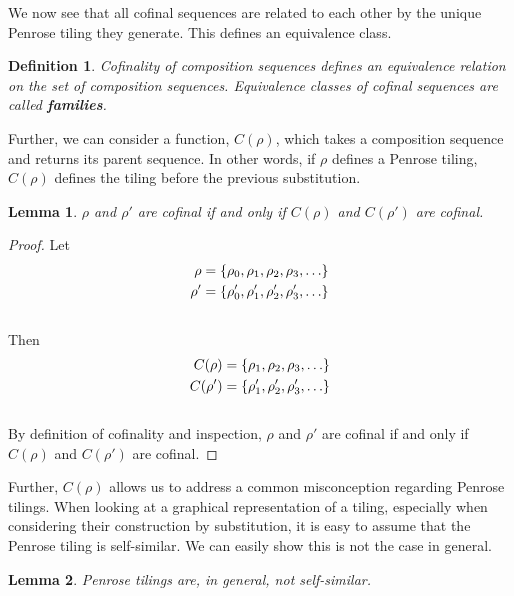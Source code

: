 \documentclass[
  oneside,
  11pt, a4paper,
  footinclude=true,
  headinclude=true,
  cleardoublepage=empty
]{scrbook}
\newtheorem{mydef}{Definition}
\newtheorem{mylem}{Lemma}
\begin{document}
We now see that all cofinal sequences are related to each other by the unique Penrose tiling they generate. This defines an equivalence class.

\begin{mydef}
Cofinality of composition sequences defines an equivalence relation on the set of composition sequences. Equivalence classes of cofinal sequences are called \textbf{families}.
\end{mydef}

Further, we can consider a function, $C(\rho)$, which takes a composition sequence and returns its parent sequence. In other words, if $\rho$ defines a Penrose tiling, $C(\rho)$ defines the tiling before the previous substitution. 

\begin{mylem}
$\rho$ and $\rho'$ are cofinal if and only if $C(\rho)$ and $C(\rho')$ are cofinal.
\end{mylem}

\begin{proof}
Let 
\begin{equation*}\begin{split}
\rho=\{\rho_0,\rho_1,\rho_2,\rho_3,\mathellipsis\}\\
\rho'=\{\rho'_0,\rho'_1,\rho'_2,\rho'_3,\mathellipsis\}
\end{split}
\end{equation*}\\
Then 
\begin{equation*}
\begin{split}
C(\rho)=\{\rho_1,\rho_2,\rho_3,\mathellipsis\}\\
C(\rho')=\{\rho'_1,\rho'_2,\rho'_3,\mathellipsis\}
\end{split}
\end{equation*}\\
By definition of cofinality and inspection, $\rho$ and $\rho'$ are cofinal if and only if $C(\rho)$ and $C(\rho')$ are cofinal.
\end{proof}

Further, $C(\rho)$ allows us to address a common misconception regarding Penrose tilings. When looking at a graphical representation of a tiling, especially when considering their construction by substitution, it is easy to assume that the Penrose tiling is self-similar. We can easily show this is not the case in general.

\begin{mylem}
Penrose tilings are, in general, not self-similar.
\end{mylem}
\end{document}
